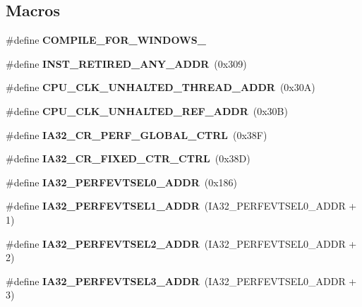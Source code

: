 \subsection*{Macros}
\begin{DoxyCompactItemize}
\item 
\#define {\bfseries C\+O\+M\+P\+I\+L\+E\+\_\+\+F\+O\+R\+\_\+\+W\+I\+N\+D\+O\+W\+S\+\_}\label{types_8h_acdb50b755dc495c5f6b010e8c7334e2b}

\item 
\#define {\bfseries I\+N\+S\+T\+\_\+\+R\+E\+T\+I\+R\+E\+D\+\_\+\+A\+N\+Y\+\_\+\+A\+D\+D\+R}~(0x309)\label{types_8h_abee4b00b55da6bf6f0f037b1b397be92}

\item 
\#define {\bfseries C\+P\+U\+\_\+\+C\+L\+K\+\_\+\+U\+N\+H\+A\+L\+T\+E\+D\+\_\+\+T\+H\+R\+E\+A\+D\+\_\+\+A\+D\+D\+R}~(0x30\+A)\label{types_8h_a065c692e17728e02e4182e721991ecf1}

\item 
\#define {\bfseries C\+P\+U\+\_\+\+C\+L\+K\+\_\+\+U\+N\+H\+A\+L\+T\+E\+D\+\_\+\+R\+E\+F\+\_\+\+A\+D\+D\+R}~(0x30\+B)\label{types_8h_a0e8b3248880f64b712ada0ae6cd8057e}

\item 
\#define {\bfseries I\+A32\+\_\+\+C\+R\+\_\+\+P\+E\+R\+F\+\_\+\+G\+L\+O\+B\+A\+L\+\_\+\+C\+T\+R\+L}~(0x38\+F)\label{types_8h_af75f65880118628dac6b97221eea5f65}

\item 
\#define {\bfseries I\+A32\+\_\+\+C\+R\+\_\+\+F\+I\+X\+E\+D\+\_\+\+C\+T\+R\+\_\+\+C\+T\+R\+L}~(0x38\+D)\label{types_8h_abd4597ec09d6e135869d4e5e40b4bcb9}

\item 
\#define {\bfseries I\+A32\+\_\+\+P\+E\+R\+F\+E\+V\+T\+S\+E\+L0\+\_\+\+A\+D\+D\+R}~(0x186)\label{types_8h_a259b1657dd97a573ac9f265a121e5413}

\item 
\#define {\bfseries I\+A32\+\_\+\+P\+E\+R\+F\+E\+V\+T\+S\+E\+L1\+\_\+\+A\+D\+D\+R}~(I\+A32\+\_\+\+P\+E\+R\+F\+E\+V\+T\+S\+E\+L0\+\_\+\+A\+D\+D\+R + 1)\label{types_8h_abc4be06ea51529572906dfa1a503b9ec}

\item 
\#define {\bfseries I\+A32\+\_\+\+P\+E\+R\+F\+E\+V\+T\+S\+E\+L2\+\_\+\+A\+D\+D\+R}~(I\+A32\+\_\+\+P\+E\+R\+F\+E\+V\+T\+S\+E\+L0\+\_\+\+A\+D\+D\+R + 2)\label{types_8h_a387524f9b226cefe58103a990334e420}

\item 
\#define {\bfseries I\+A32\+\_\+\+P\+E\+R\+F\+E\+V\+T\+S\+E\+L3\+\_\+\+A\+D\+D\+R}~(I\+A32\+\_\+\+P\+E\+R\+F\+E\+V\+T\+S\+E\+L0\+\_\+\+A\+D\+D\+R + 3)\label{types_8h_ab4670da4066d99e7761424091bb398ec}


\end{DoxyCompactItemize}
